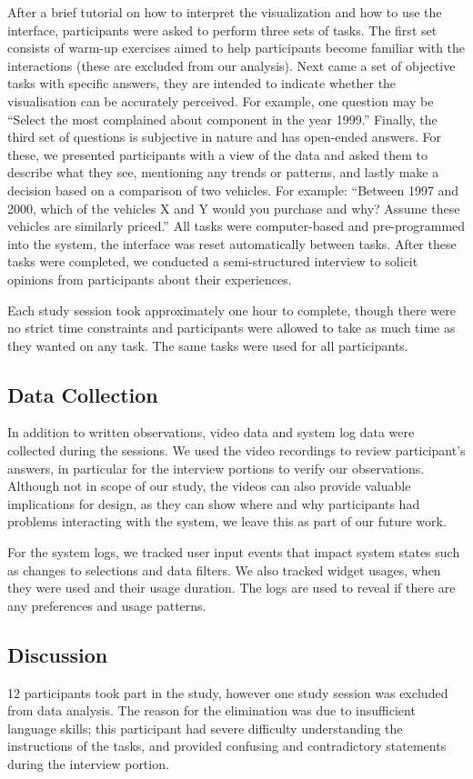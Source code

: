 After a brief tutorial on how to interpret the visualization and how to use the
interface, participants were asked to perform three sets of tasks. The first set
consists of warm-up exercises aimed to help participants become familiar with the 
interactions (these are excluded from our analysis). Next came a set of
objective tasks with specific answers, they are intended to indicate whether the
\threed visualisation can be accurately perceived. For example, one question may
be ``Select the most complained about component in the year 1999.'' Finally,
the third set of questions is subjective in nature and has open-ended answers.
For these, we presented participants with a view of the data and asked them to
describe what they see, mentioning any trends or patterns, and lastly make a
decision based on a comparison of two vehicles. For example: ``Between 1997 and
2000, which of the vehicles X and Y would you purchase and why? Assume these vehicles are
similarly priced.'' All tasks were computer-based and pre-programmed into the system, 
the interface was reset automatically between tasks. After these tasks were completed, 
we conducted a semi-structured interview to solicit opinions from participants about their experiences.  

Each study session took approximately one hour to complete, though there were no
strict time constraints and participants were allowed to take as much time as
they wanted on any task. The same tasks were used for all
participants. 


\subsection{Data Collection}
In addition to written observations, video data and system log data were 
collected during the sessions. We used the video recordings to review 
participant's answers, in particular for the interview portions to verify 
our observations. Although not in scope of our study, the videos can also provide 
valuable implications for design, as they can show where and why participants had 
problems interacting with the system, we leave this as part of our future work. 

For the system logs, we tracked user input events that impact system states such
as changes to selections and data filters. We also tracked widget usages, when they were used and
their usage duration. The logs are used to reveal if there are any preferences and usage 
patterns.
 

\subsection{Discussion}
12 participants took part in the study, however one study session was excluded
from data analysis. The reason for the elimination was due to insufficient language skills; 
this participant had severe difficulty understanding the instructions of the tasks, 
and provided confusing and contradictory statements during the interview portion.

